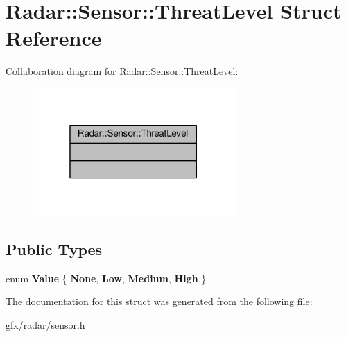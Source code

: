 \hypertarget{structRadar_1_1Sensor_1_1ThreatLevel}{}\section{Radar\+:\+:Sensor\+:\+:Threat\+Level Struct Reference}
\label{structRadar_1_1Sensor_1_1ThreatLevel}


Collaboration diagram for Radar\+:\+:Sensor\+:\+:Threat\+Level\+:
\nopagebreak
\begin{figure}[H]
\begin{center}
\leavevmode
\includegraphics[width=217pt]{d7/d89/structRadar_1_1Sensor_1_1ThreatLevel__coll__graph}
\end{center}
\end{figure}
\subsection*{Public Types}
\begin{DoxyCompactItemize}
\item 
enum {\bfseries Value} \{ {\bfseries None}, 
{\bfseries Low}, 
{\bfseries Medium}, 
{\bfseries High}
 \}\hypertarget{structRadar_1_1Sensor_1_1ThreatLevel_a289147c1427777198c89b03dc332d706}{}\label{structRadar_1_1Sensor_1_1ThreatLevel_a289147c1427777198c89b03dc332d706}

\end{DoxyCompactItemize}


The documentation for this struct was generated from the following file\+:\begin{DoxyCompactItemize}
\item 
gfx/radar/sensor.\+h\end{DoxyCompactItemize}
